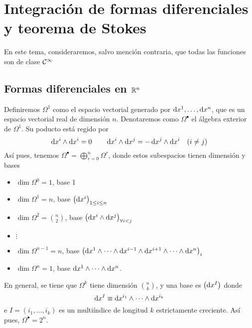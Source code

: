 \chapter{Integración de formas diferenciales y teorema de Stokes}

En este tema, consideraremos, salvo mención contraria, que todas las funciones son de clase $\mathcal{C}^\infty$

\section{Formas diferenciales en $\mathbb{R}^n$}

\begin{defi}
    Definiremos $\Omega^1$ como el espacio vectorial generado por $\dif x^1, \dots, \dif x^n$, que es un espacio vectorial real de dimensión $n$.
    Denotaremos como $\Omega^\bullet$ el álgebra exterior de $\Omega^1$. Su poducto está regido por
    \[
        \dif x^i \wedge \dif x^i = 0
        \qquad
        \dif x^i \wedge \dif x^j = -\dif x^j \wedge \dif x^i \quad (i \neq j)
    \]
    Así pues, tenemos $\Omega^\bullet = \bigoplus\limits^{n}_{r = 0} \Omega^r$, donde estos subespacios tienen dimensión y bases
    \begin{itemize}
        \item $\dim \Omega^0 = 1$, base 1
        \item $\dim \Omega^1 = n$, base $\left( \dif x^i \right)_{1 \leq i \leq n}$
        \item $\dim \Omega^2 = \binom{n}{2}$, base $\left( \dif x^i \wedge \dif x^j \right)_{\forall i < j}$
        \item $\vdots$
        \item $\dim \Omega^{n-1} = n$, base $\left( \dif x^1 \wedge \cdots \wedge \dif x^{i-1} \wedge \dif x^{i+1} \wedge \cdots \wedge \dif x^n \right)_i$
        \item $\dim \Omega^n = 1$, base $\dif x^1 \wedge \cdots \wedge \dif x^n$.
    \end{itemize}

    En general, se tiene que $\Omega^k$ tiene dimensión $\binom{n}{k}$, y una base es $\left( \dif x^I \right)$ donde
    \[
        \dif x^I \equiv \dif x^{i_1} \wedge \cdots \wedge \dif x^{i_k}
    \]
    e $I = \left( i_1, \dots, i_k \right)$ es un multiíndice de longitud $k$ estrictamente creciente. Así pues, $\Omega^\bullet = 2^n$.
\end{defi}

